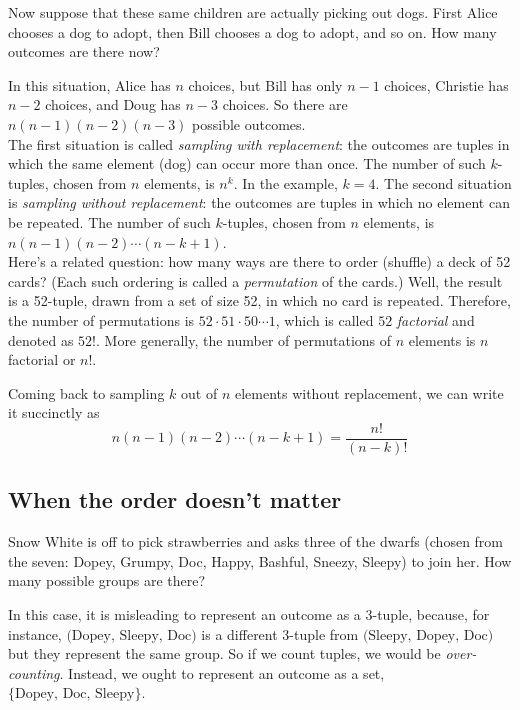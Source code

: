 Now suppose that these same children are actually picking out dogs. First Alice 
chooses a dog to adopt, then Bill chooses a dog to adopt, and so on. How many 
outcomes are there now?

In this situation, Alice has $n$ choices, but Bill has only $n-1$ choices,
Christie has $n-2$ choices, and Doug has $n-3$ choices. So there are
$n(n-1)(n-2)(n-3)$ possible outcomes.\\

The first situation is called {\it sampling with replacement}: the
outcomes are tuples in which the same element (dog) can occur more
than once. The number of such $k$-tuples, chosen from $n$ elements, is
$n^k$. In the example, $k=4$. The second situation is {\it sampling
  without replacement}: the outcomes are tuples in which no element
can be repeated. The number of such $k$-tuples, chosen from $n$
elements, is $n(n-1)(n-2) \cdots (n-k+1)$. \\

Here's a related question: how many ways are there to order (shuffle)
a deck of 52 cards?  (Each such ordering is called a {\it permutation}
of the cards.) Well, the result is a 52-tuple, drawn from a set of
size 52, in which no card is repeated. Therefore, the number of
permutations is $52 \cdot 51 \cdot 50 \cdots 1$, which is called $52$
{\em factorial} and denoted as $52!$. More generally, the number of
permutations of $n$ elements is $n$ factorial or $n!$.

Coming back to sampling $k$ out of $n$ elements without replacement,
we can write it succinctly as 
\[
n(n-1)(n-2) \cdots (n-k+1) = \frac{n!}{(n-k)!}
\]

\subsection{When the order doesn't matter}

Snow White is off to pick strawberries and asks three of the dwarfs (chosen 
from the seven: Dopey, Grumpy, Doc, Happy, Bashful, Sneezy, Sleepy) to join 
her. How many possible groups are there?

In this case, it is misleading to represent an outcome as a 3-tuple, because, 
for instance, $\mbox{(Dopey, Sleepy, Doc)}$ is a different 3-tuple from
$\mbox{(Sleepy, Dopey, Doc)}$ but they represent the same group. So if we count
tuples, we would be {\it over-counting}. Instead, we ought to represent an 
outcome as a set, $ \{\mbox{Dopey, Doc, Sleepy}\}$.

